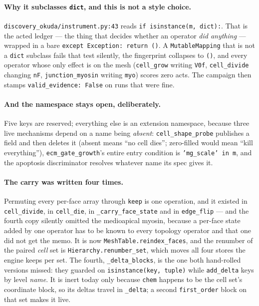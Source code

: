 \documentclass[11pt,a4paper]{article}
\newcommand{\code}[1]{\texttt{\small #1}}
\begin{document}
\paragraph{Why it subclasses \code{dict}, and this is not a style choice.}
\code{discovery\_okuda/instrument.py:43} reads \code{if isinstance(m, dict):}. That is the acted
ledger --- the thing that decides whether an operator \emph{did anything} --- wrapped in a bare
\code{except Exception: return ()}. A \code{MutableMapping} that is not a \code{dict} subclass fails
that test silently, the fingerprint collapses to \code{()}, and every operator whose only effect is
on the mesh (\code{cell\_grow} writing \code{V0f}, \code{cell\_divide} changing \code{nF},
\code{junction\_myosin} writing \code{myo}) scores zero acts. The campaign then stamps
\code{valid\_evidence: False} on runs that were fine.

\paragraph{And the namespace stays open, deliberately.} Five keys are reserved; everything else is an
extension namespace, because three live mechanisms depend on a name being \emph{absent}:
\code{cell\_shape\_probe} publishes a field and then deletes it (absent means ``no cell dies'';
zero-filled would mean ``kill everything''), \code{ecm\_gate\_growth}'s entire entry condition is
\code{'mg\_scale' in m}, and the apoptosis discriminator resolves whatever name its spec gives it.

\paragraph{The carry was written four times.} Permuting every per-face array through \code{keep} is
one operation, and it existed in \code{cell\_divide}, in \code{cell\_die}, in
\code{\_carry\_face\_state} and in \code{edge\_flip} --- and the fourth copy silently omitted the
medioapical myosin, because a per-face state added by one operator has to be known to every topology
operator and that one did not get the memo. It is now \code{MeshTable.reindex\_faces}, and the
renumber of the paired \emph{cell} set is \code{Hierarchy.renumber\_set}, which moves all four stores
the engine keeps per set. The fourth, \code{\_delta\_blocks}, is the one both hand-rolled versions
missed: they guarded on \code{isinstance(key, tuple)} while \code{add\_delta} keys by level
\emph{name}. It is inert today only because \code{chem} happens to be the cell set's coordinate
block, so its deltas travel in \code{\_delta}; a second \code{first\_order} block on that set makes
it live.
\end{document}
